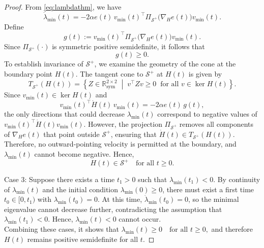\documentclass[reqno]{amsart}
\numberwithin{equation}{section}
\begin{document}
\begin{proof}
From \eqref{eq:lambdathm}, we have
\[
\dot{\lambda}_{\min}(t)
= -2\alpha e(t)\,
v_{\min}(t)^\top
\Pi_{\mathcal S^+}\big(\nabla_H e(t)\big)
v_{\min}(t).
\]
Define
\[
g(t)
:= v_{\min}(t)^\top
\Pi_{\mathcal S^+}\big(\nabla_H e(t)\big)
v_{\min}(t).
\]
Since $\Pi_{\mathcal S^+}(\cdot)$ is symmetric positive semidefinite,
it follows that
\[
g(t) \ge 0.
\] To establish invariance of $\mathcal S^+$, we examine the geometry of the cone
at the boundary point $H(t)$. The tangent cone to $\mathcal S^+$ at $H(t)$ is
given by
\[
T_{\mathcal S^+}(H(t))
=
\left\{
Z \in \mathbb{R}^{2\times 2}_{\mathrm{sym}}
\;\middle|\;
v^\top Z v \ge 0
\;\; \text{for all } v \in \ker H(t)
\right\}.
\]
Since $v_{\min}(t)\in \ker H(t)$ and
\[
v_{\min}(t)^\top \dot H(t)\, v_{\min}(t)
=
-2\alpha e(t)\, g(t),
\]
the only directions that could decrease $\lambda_{\min}(t)$ correspond to
negative values of $v_{\min}(t)^\top \dot H(t) v_{\min}(t)$.
However, the projection $\Pi_{\mathcal S^+}$ removes all components of
$\nabla_H e(t)$ that point outside $\mathcal S^+$, ensuring that
$\dot H(t)\in T_{\mathcal S^+}(H(t))$.
Therefore, no outward-pointing velocity is permitted at the boundary, and
$\lambda_{\min}(t)$ cannot become negative. Hence,
\[
H(t) \in \mathcal S^+ \quad \text{for all } t \ge 0.
\]


Case 3:  Suppose there exists a time $t_1 > 0$ such that $\lambda_{\min}(t_1) < 0$. By continuity of $\lambda_{\min}(t)$ and the initial condition $\lambda_{\min}(0) \ge 0$, there must exist a first time $t_0 \in [0,t_1)$ with $\lambda_{\min}(t_0) = 0$. At this time, $\dot \lambda_{\min}(t_0) = 0$, so the minimal eigenvalue cannot decrease further, contradicting the assumption that $\lambda_{\min}(t_1) < 0$. Hence, $\lambda_{\min}(t) < 0$ cannot occur.\\

Combining these cases, it shows that $
\lambda_{\min}(t) \ge 0 \quad \text{for all } t \ge 0, $ and therefore $H(t)$ remains positive semidefinite for all $t$.

\end{proof}
\end{document}
